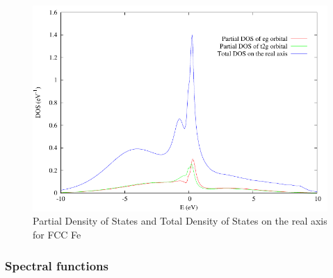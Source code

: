 \documentclass[12 pt]{article}
\begin{document}
  \begin{figure}[ht]
    \centering
    \captionsetup{justification=centering}
    \caption{Partial Density of States and Total Density of States on the real axis for FCC Fe}
    \label{Partial Density of States and Total Density of States on the real axis for FCC Fe}
    \vspace{2ex}
    \includegraphics[scale=1.3]{gnuplotPartialDOSTotalDOS}
  \end{figure}

  \cleardoublepage

      \subsubsection{Spectral functions}
\end{document}
